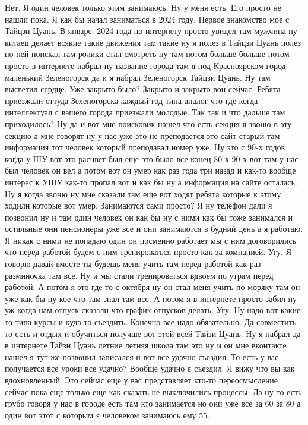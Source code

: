Нет.
Я один человек только этим занимаюсь.
Ну у меня есть.
Его просто не нашли пока.
Я как бы начал заниматься в 2024 году.
Первое знакомство мое с Тайцзи Цуань.
В январе.
2024 года по интернету просто увидел там мужчина ну китаец делает всякие такие движения там такие ну я полез в Тайцзи Цуань полез по ней поискал там ролики стал смотреть ну там потом больше больше потом просто в интернете набрал ну название города там я под Красноярском город маленький Зеленогорск да и я набрал Зеленогорск Тайцзи Цуань.
Ну там высветил сердце.
Уже закрыто было?
Закрыто и закрыто вон сейчас.
Ребята приезжали оттуда Зеленогорска каждый год типа аналог что где когда интеллектуал с вашего города приезжали молодые.
Так так и что дальше там приходилось?
Ну да и вот мне поисковик нашел что есть секция я звоню в эту секцию а мне говорят ну у нас уже это не преподается это сайт старый там информация тот человек который преподавал номер уже.
Ну это с 90-х годов когда у ШУ вот это расцвет был еще это было все конец 80-х 90-х вот там у нас был человек он вел а потом вот он умер как раз года три назад и как-то вообще интерес к УШУ как-то пропал вот и как бы ну а информация на сайте осталась.
Ну я когда звоню ну мне сказали там еще вот ходят ребята которые к этому ходили которые вот умер.
Занимаются сами просто?
Я ну телефон дали я позвонил ну и там один человек он как бы ну с ними как бы тоже занимался и остальные они пенсионеры уже все и они занимаются в будний день а я работаю.
Я никак с ними не попадаю один он посменно работает мы с ним договорились что перед работой будем с ним тренироваться просто как за компанией.
Угу.
Я говорю давай вместе ты будешь меня учить там перед работой как раз разминочка там все.
Ну и мы стали тренироваться вдвоем по утрам перед работой.
А потом я это где-то с октября ну он стал меня учить по моряку там он уже как бы ну кое-что там знал там все.
А потом я в интернете просто забил ну уж когда нам отпуск сказали что график отпусков делать.
Угу.
Ну надо вот какие-то типа курсы и куда-то съездить.
Конечно все надо обязательно.
Да совместить то есть и отдых и обучиться получше вот этой всей Тайзи Цуань.
Ну я набрал да в интернете Тайзи Цуань летние летняя школа там это ну и он мне вконтакте нашел я тут же позвонил записался и вот все удачно съездил.
То есть у вас получается все уроки все удачно?
Вообще удачно я съездил.
Я вижу что вы как вдохновленный.
Это сейчас еще у вас представляет кто-то переосмысление сейчас пока еще только еще как сказать не выключились процессы.
Да ну то есть грубо говоря у нас в городе есть там кто занимается но они уже все за 60 за 80 а один вот этот с которым я человеком занимаюсь ему 55.
